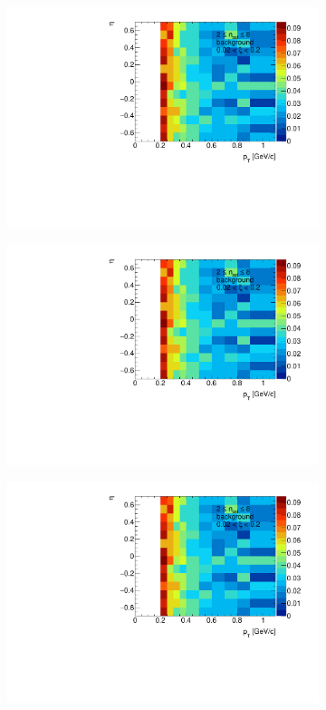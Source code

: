\begin{figure}[h!]
	\centering
	\begin{subfigure}{.45\textwidth}
		\includegraphics[width=\linewidth, page=1]{chapters/chrgSTAR/img/chargedBkg/bkg2D.pdf}
	\end{subfigure}
	\begin{subfigure}{.45\textwidth}
		\includegraphics[width=\linewidth, page=3]{chapters/chrgSTAR/img/chargedBkg/bkg2D.pdf}
	\end{subfigure}
	\begin{subfigure}{.45\textwidth}
		\includegraphics[width=\linewidth, page=4]{chapters/chrgSTAR/img/chargedBkg/bkg2D.pdf}

\end{subfigure}
\end{figure}
